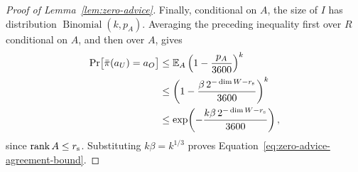 \begin{proof}[Proof of Lemma~\ref{lem:zero-advice}]
Finally, conditional on $A$, the size of $I$ has distribution
$\operatorname{Binomial}(k,p_A)$.  Averaging the preceding inequality
first over $R$ conditional on $A$, and then over $A$, gives
\begin{align*}
 \Pr\bigl[\bar\pi(a_U)=a_O\bigr]
 &\le \mathbb E_A\left(1-\frac{p_A}{3600}\right)^k\\
 &\le\left(1-\frac{\beta\,2^{-\dim W-r_{\rm s}}}{3600}\right)^k\\
 &\le \exp\!\left(
 -\frac{k\beta\,2^{-\dim W-r_{\rm s}}}{3600}
 \right),
\end{align*}
since $\operatorname{rank} A\le r_{\rm s}$.  Substituting
$k\beta=k^{1/3}$ proves Equation~\eqref{eq:zero-advice-agreement-bound}.
\end{proof}
